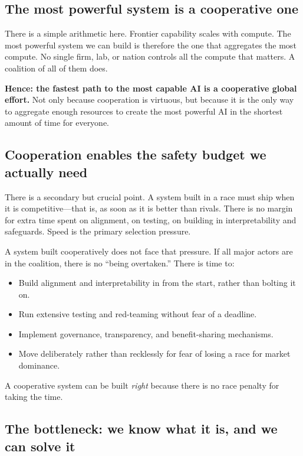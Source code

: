 \documentclass[12pt]{article}
\begin{document}
\subsection{The most powerful system is a cooperative one}

There is a simple arithmetic here. Frontier capability scales with compute. The
most powerful system we can build is therefore the one that aggregates the most
compute. No single firm, lab, or nation controls all the compute that matters.
A coalition of all of them does.

\textbf{Hence: the fastest path to the most capable AI is a cooperative global
effort.} Not only because cooperation is virtuous, but because it is the only way to
aggregate enough resources to create the most powerful AI in the shortest amount of time for everyone.

\subsection{Cooperation enables the safety budget we actually need}

There is a secondary but crucial point. A system built in a race must ship when
it is competitive---that is, as soon as it is better than rivals. There is no
margin for extra time spent on alignment, on testing, on building in
interpretability and safeguards. Speed is the primary selection pressure.

A system built cooperatively does not face that pressure. If all major actors are
in the coalition, there is no ``being overtaken.'' There is time to:
\begin{itemize}[leftmargin=1.6em,itemsep=4pt]
  \item Build alignment and interpretability in from the start, rather than
  bolting it on.
  \item Run extensive testing and red-teaming without fear of a deadline.
  \item Implement governance, transparency, and benefit-sharing mechanisms.
  \item Move deliberately rather than recklessly for fear of losing a race for market dominance.
\end{itemize}

A cooperative system can be built \emph{right} because there is no race penalty
for taking the time.

\subsection{The bottleneck: we know what it is, and we can solve it}
\end{document}
